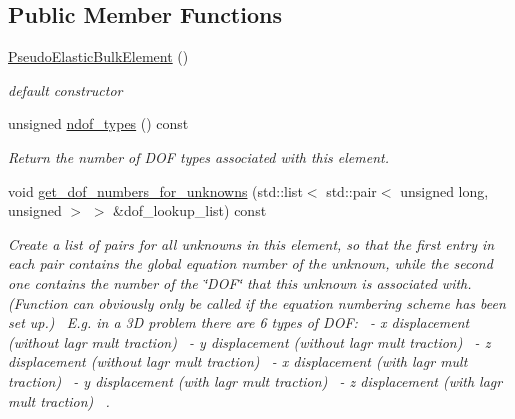 \subsection*{Public Member Functions}
\begin{DoxyCompactItemize}
\item 
\hyperlink{classoomph_1_1PseudoElasticBulkElement_a38c03edd9639522e713ef9bf679d7e5a}{Pseudo\+Elastic\+Bulk\+Element} ()
\begin{DoxyCompactList}\small\item\em default constructor \end{DoxyCompactList}\item 
unsigned \hyperlink{classoomph_1_1PseudoElasticBulkElement_a18674d52b96db8800d31e89ffd465175}{ndof\+\_\+types} () const
\begin{DoxyCompactList}\small\item\em Return the number of D\+OF types associated with this element. \end{DoxyCompactList}\item 
void \hyperlink{classoomph_1_1PseudoElasticBulkElement_a8f1dc2011100324953293470a18f3080}{get\+\_\+dof\+\_\+numbers\+\_\+for\+\_\+unknowns} (std\+::list$<$ std\+::pair$<$ unsigned long, unsigned $>$ $>$ \&dof\+\_\+lookup\+\_\+list) const
\begin{DoxyCompactList}\small\item\em Create a list of pairs for all unknowns in this element, so that the first entry in each pair contains the global equation number of the unknown, while the second one contains the number of the \char`\"{}\+D\+O\+F\char`\"{} that this unknown is associated with. (Function can obviously only be called if the equation numbering scheme has been set up.)~\newline
E.\+g. in a 3D problem there are 6 types of D\+OF\+:~ -\/ x displacement (without lagr mult traction)~ -\/ y displacement (without lagr mult traction)~ -\/ z displacement (without lagr mult traction)~ -\/ x displacement (with lagr mult traction)~ -\/ y displacement (with lagr mult traction)~ -\/ z displacement (with lagr mult traction)~\newline
. \end{DoxyCompactList}\end{DoxyCompactItemize}


